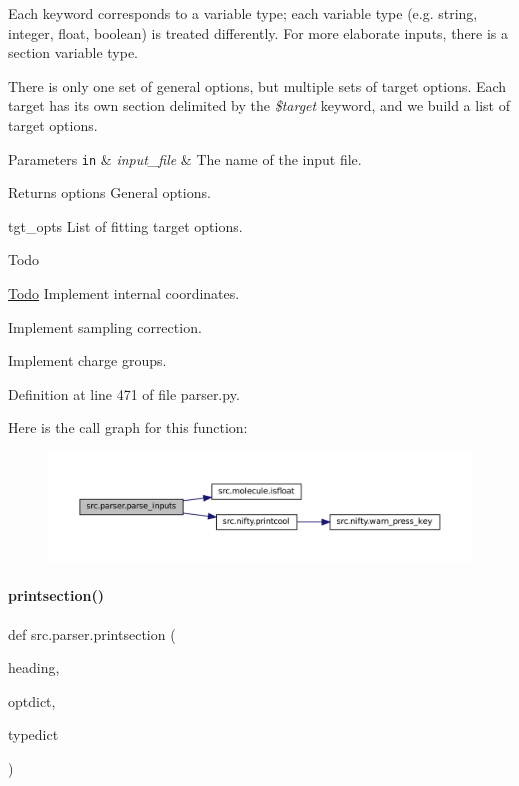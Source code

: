 Each keyword corresponds to a variable type; each variable type (e.\+g. string, integer, float, boolean) is treated differently. For more elaborate inputs, there is a \textquotesingle{}section\textquotesingle{} variable type.

There is only one set of general options, but multiple sets of target options. Each target has its own section delimited by the {\itshape \$target} keyword, and we build a list of target options.


\begin{DoxyParams}[1]{Parameters}
\mbox{\tt in}  & {\em input\+\_\+file} & The name of the input file. \\
\hline
\end{DoxyParams}
\begin{DoxyReturn}{Returns}
options General options. 

tgt\+\_\+opts List of fitting target options.
\end{DoxyReturn}
\begin{DoxyRefDesc}{Todo}
\item[\hyperlink{todo__todo000014}{Todo}]Implement internal coordinates. 

Implement sampling correction. 

Implement charge groups. \end{DoxyRefDesc}


Definition at line 471 of file parser.\+py.

Here is the call graph for this function\+:
\nopagebreak
\begin{figure}[H]
\begin{center}
\leavevmode
\includegraphics[width=350pt]{namespacesrc_1_1parser_a0931939fda05a56904977f2b4e1394d2_cgraph}
\end{center}
\end{figure}
\mbox{\label{namespacesrc_1_1parser_a070e27d6697698ee71f789283d019d52}} 
\paragraph{\texorpdfstring{printsection()}{printsection()}}
{\footnotesize\ttfamily def src.\+parser.\+printsection (\begin{DoxyParamCaption}\item[{}]{heading,  }\item[{}]{optdict,  }\item[{}]{typedict }\end{DoxyParamCaption})}



